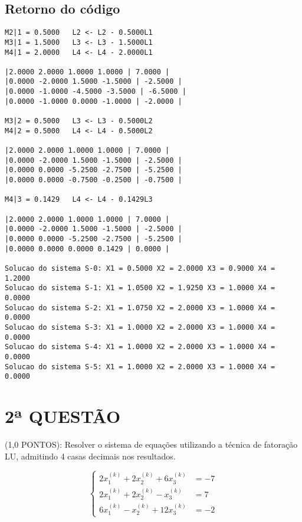 \documentclass[12pt,a4paper]{article}
\begin{document}
\subsection{Retorno do código}

\begin{verbatim}
M2|1 = 0.5000   L2 <- L2 - 0.5000L1
M3|1 = 1.5000   L3 <- L3 - 1.5000L1
M4|1 = 2.0000   L4 <- L4 - 2.0000L1

|2.0000 2.0000 1.0000 1.0000 | 7.0000 |
|0.0000 -2.0000 1.5000 -1.5000 | -2.5000 |
|0.0000 -1.0000 -4.5000 -3.5000 | -6.5000 |
|0.0000 -1.0000 0.0000 -1.0000 | -2.0000 |

M3|2 = 0.5000   L3 <- L3 - 0.5000L2
M4|2 = 0.5000   L4 <- L4 - 0.5000L2

|2.0000 2.0000 1.0000 1.0000 | 7.0000 |
|0.0000 -2.0000 1.5000 -1.5000 | -2.5000 |
|0.0000 0.0000 -5.2500 -2.7500 | -5.2500 |
|0.0000 0.0000 -0.7500 -0.2500 | -0.7500 |

M4|3 = 0.1429   L4 <- L4 - 0.1429L3

|2.0000 2.0000 1.0000 1.0000 | 7.0000 |
|0.0000 -2.0000 1.5000 -1.5000 | -2.5000 |
|0.0000 0.0000 -5.2500 -2.7500 | -5.2500 |
|0.0000 0.0000 0.0000 0.1429 | 0.0000 |

Solucao do sistema S-0: X1 = 0.5000 X2 = 2.0000 X3 = 0.9000 X4 = 1.2000
Solucao do sistema S-1: X1 = 1.0500 X2 = 1.9250 X3 = 1.0000 X4 = 0.0000
Solucao do sistema S-2: X1 = 1.0750 X2 = 2.0000 X3 = 1.0000 X4 = 0.0000
Solucao do sistema S-3: X1 = 1.0000 X2 = 2.0000 X3 = 1.0000 X4 = 0.0000
Solucao do sistema S-4: X1 = 1.0000 X2 = 2.0000 X3 = 1.0000 X4 = 0.0000
Solucao do sistema S-5: X1 = 1.0000 X2 = 2.0000 X3 = 1.0000 X4 = 0.0000
\end{verbatim}

\newpage

\noindent \section{2ª QUESTÃO} (1,0 PONTOS): Resolver o sistema de equações utilizando a técnica de fatoração LU, admitindo 4 casas decimais nos resultados.

\[
\left\{
\begin{aligned}
2x_1^{(k)} + 2x_2^{(k)} + 6x_3^{(k)} &= -7 \\
2x_1^{(k)} + 2x_2^{(k)} - x_3^{(k)} &= 7 \\
6x_1^{(k)} - x_2^{(k)} + 12x_3^{(k)} &= -2
\end{aligned}
\right.
\]
\end{document}
